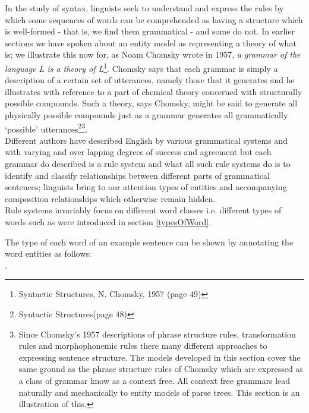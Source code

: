 \noindent In the study of syntax, linguists seek to understand and express the rules by which some sequences of words can be comprehended as having a structure which is well-formed - that is, we find them  grammatical - and some do not. In earlier sections we have spoken about an entity model as representing a theory of what is; we illustrate this now for, as Noam Chomsky wrote in 1957,
\textit{a grammar of the language L is a theory of L}\footnote{Syntactic Structures, N. Chomsky, 1957 (page 49)}. 
Chomsky says that each grammar is simply a description of a certain set of utterances, namely those that it generates and he illustrates with reference to a part of chemical theory concerned with structurally possible compounds. 
Such a theory, says Chomsky, might be said to generate all physically possible compounds just as a grammar generates all grammatically `possible' utterances\footnote{Syntactic Structures(page 48)}\footnote {Since Chomsky's 1957 descriptions of phrase structure rules, transformation rules and morphophonemic rules there many different approaches to expressing sentence structure. The models developed in this section cover the same ground as the phrase structure rules of Chomsky which are expressed as a class of grammar know as a context free. All context free grammars lead naturally and mechanically to entity models of parse trees. This section is an illustration of this.}.\\

\noindent Different authors have described English by various grammatical systems and with varying and over lapping degrees of success and agreement but each grammar do described is a rule system and what all such rule systems do is to identify and classify relationships between different parts of grammatical sentences; linguists bring to our attention types of entities and accompanying composition relationships which otherwise remain hidden. \\

\noindent Rule systems invariably focus on different word classes i.e. different types of words such as were introduced in section \ref{typesOfWord}.

\vspace{0.25cm}
\noindent  The type of each word of an example sentence  can be shown by annotating the word entities as follows: \\

      .\\
\vspace{0.3cm}

